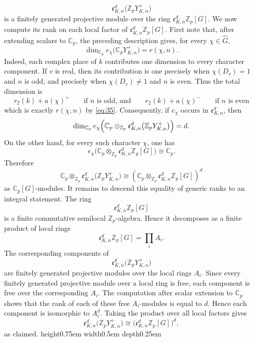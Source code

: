 \documentclass[a4paper,11pt]{article}
\newenvironment{proof}[1][Proof]{\begin{trivlist}
\item[\hskip \labelsep {\bfseries #1}]}{\end{trivlist}}
\newcommand{\qed}{\nobreak \ifvmode \relax \else
    \ifdim\lastskip<1.5em \hskip-\lastskip
     \hskip1.5em plus0em minus0.5em \fi \nobreak
      \vrule height0.75em width0.5em depth0.25em\fi}
\begin{document}
\begin{proof}
\[
\mathfrak e_{K,n}^d
\bigl(\mathbb{Z}_pY_{K,n}^{+}\bigr)
\]
is a finitely generated projective module over the ring
\(
\mathfrak e_{K,n}^d\mathbb Z_p[G].
\)
We now compute its rank on each local factor of
\(\mathfrak e_{K,n}^d\mathbb Z_p[G]\). First note that, after extending scalars
to \(\mathbb C_p\), the preceding description gives, for every
\(\chi\in\widehat G\),
\[
\dim_{\mathbb C_p}
e_\chi\bigl(\mathbb C_pY_{K,n}^{+}\bigr)
=
r(\chi,n).
\]
Indeed, each complex place of \(k\) contributes one dimension to every
character component. If \(v\) is real, then its contribution is one precisely
when \(\chi(D_v)=1\) and \(n\) is odd, and precisely when \(\chi(D_v)\neq 1\)
and \(n\) is even. Thus the total dimension is
\[
r_2(k)+a(\chi)^+
\qquad \text{
if \(n\) is odd, and}
\qquad 
r_2(k)+a(\chi)^-
\qquad \text{if \(n\) is even}\] which is exactly \(r(\chi,n)\) by \eqref{eq:35}.
Consequently, if \(e_\chi\) occurs in \(\mathfrak e_{K,n}^d\), then
\[
\dim_{\mathbb C_p}
e_\chi\Bigl(
\mathbb C_p\otimes_{\mathbb Z_p}
\mathfrak e_{K,n}^d
\bigl(\mathbb{Z}_pY_{K,n}^{+}\bigr)
\Bigr)
=
d.
\]
On the other hand, for every such character \(\chi\), one has
\[
e_\chi
\bigl(
\mathbb C_p\otimes_{\mathbb Z_p}
\mathfrak e_{K,n}^d\mathbb Z_p[G]
\bigr)
\cong
\mathbb C_p.
\]
Therefore
\[
\mathbb C_p\otimes_{\mathbb Z_p}
\mathfrak e_{K,n}^d
\bigl(\mathbb{Z}_pY_{K,n}^{+}\bigr)
\cong
\left(
\mathbb C_p\otimes_{\mathbb Z_p}
\mathfrak e_{K,n}^d\mathbb Z_p[G]
\right)^d
\]
as \(\mathbb C_p[G]\)-modules.
It remains to descend this equality of generic ranks to an integral statement.
The ring
\[
\mathfrak e_{K,n}^d\mathbb Z_p[G]
\]
is a finite commutative semilocal \(\mathbb Z_p\)-algebra. Hence it decomposes
as a finite product of local rings
\[
\mathfrak e_{K,n}^d\mathbb Z_p[G]
=
\prod_i A_i.
\]
The corresponding components of
\[
\mathfrak e_{K,n}^d
\bigl(\mathbb{Z}_pY_{K,n}^{+}\bigr)
\]
are finitely generated projective modules over the local rings \(A_i\). Since
every finitely generated projective module over a local ring is free, each
component is free over the corresponding \(A_i\).
The computation after scalar extension to \(\mathbb C_p\) shows that the rank
of each of these free \(A_i\)-modules is equal to \(d\). Hence each component is
isomorphic to \(A_i^d\). Taking the product over all local factors gives
\[
\mathfrak e_{K,n}^d
\bigl(\mathbb{Z}_pY_{K,n}^{+}\bigr)
\cong
\bigl(\mathfrak e_{K,n}^d\mathbb Z_p[G]\bigr)^d,
\]
as claimed.\qed
\end{proof}
\end{document}

